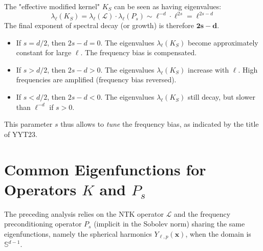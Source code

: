 \documentclass{article}
\begin{document}
The "effective modified kernel" $K_S$ can be seen as having eigenvalues:
\begin{equation}
    \lambda_\ell(K_S) = \lambda_\ell(\mathcal{L}) \cdot \lambda_\ell(P_s) \sim \ell^{-d} \cdot \ell^{2s} = \ell^{2s-d}
    \label{eq:final_exponent}
\end{equation}
The final exponent of spectral decay (or growth) is therefore $\mathbf{2s-d}$.
\begin{itemize}
    \item If $s = d/2$, then $2s-d = 0$. The eigenvalues $\lambda_\ell(K_S)$ become approximately constant for large $\ell$. The frequency bias is compensated.
    \item If $s > d/2$, then $2s-d > 0$. The eigenvalues $\lambda_\ell(K_S)$ increase with $\ell$. High frequencies are amplified (frequency bias reversed).
    \item If $s < d/2$, then $2s-d < 0$. The eigenvalues $\lambda_\ell(K_S)$ still decay, but slower than $\ell^{-d}$ if $s>0$.
\end{itemize}
This parameter $s$ thus allows to \textit{tune} the frequency bias, as indicated by the title of YYT23.

\section{Common Eigenfunctions for Operators $K$ and $P_s$}

The preceding analysis relies on the NTK operator $\mathcal{L}$ and the frequency preconditioning operator $P_s$ (implicit in the Sobolev norm) sharing the same eigenfunctions, namely the spherical harmonics $Y_{\ell,p}(\mathbf{x})$, when the domain is $\mathbb{S}^{d-1}$.
\end{document}
